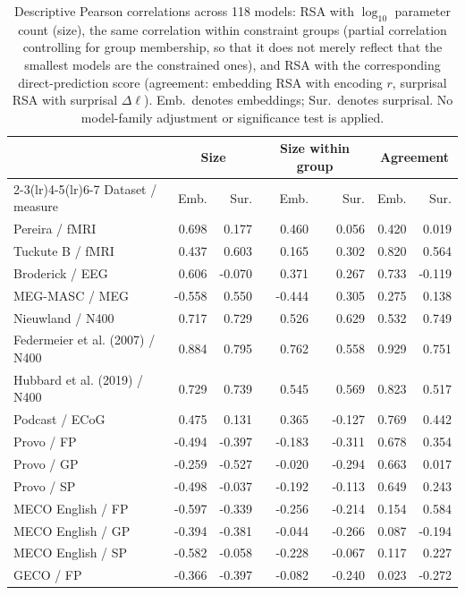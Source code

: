 \begin{table}[p]
\centering\small
\caption{Descriptive Pearson correlations across 118 models: RSA with $\log_{10}$ parameter count (size), the same correlation within constraint groups (partial correlation controlling for group membership, so that it does not merely reflect that the smallest models are the constrained ones), and RSA with the corresponding direct-prediction score (agreement: embedding RSA with encoding $r$, surprisal RSA with surprisal $\Delta\ell$). Emb.\ denotes embeddings; Sur.\ denotes surprisal. No model-family adjustment or significance test is applied.}
\label{tab:rsa-summary}
\begin{tabular}{lrrrrrr}
\toprule
& \multicolumn{2}{c}{Size} & \multicolumn{2}{c}{Size within group} & \multicolumn{2}{c}{Agreement}\\
\cmidrule(lr){2-3}\cmidrule(lr){4-5}\cmidrule(lr){6-7}
Dataset / measure & Emb. & Sur. & Emb. & Sur. & Emb. & Sur.\\
\midrule
Pereira / fMRI & 0.698 & 0.177 & 0.460 & 0.056 & 0.420 & 0.019 \\
Tuckute B / fMRI & 0.437 & 0.603 & 0.165 & 0.302 & 0.820 & 0.564 \\
Broderick / EEG & 0.606 & -0.070 & 0.371 & 0.267 & 0.733 & -0.119 \\
MEG-MASC / MEG & -0.558 & 0.550 & -0.444 & 0.305 & 0.275 & 0.138 \\
Nieuwland / N400 & 0.717 & 0.729 & 0.526 & 0.629 & 0.532 & 0.749 \\
Federmeier et al. (2007) / N400 & 0.884 & 0.795 & 0.762 & 0.558 & 0.929 & 0.751 \\
Hubbard et al. (2019) / N400 & 0.729 & 0.739 & 0.545 & 0.569 & 0.823 & 0.517 \\
Podcast / ECoG & 0.475 & 0.131 & 0.365 & -0.127 & 0.769 & 0.442 \\
\midrule
Provo / FP & -0.494 & -0.397 & -0.183 & -0.311 & 0.678 & 0.354 \\
Provo / GP & -0.259 & -0.527 & -0.020 & -0.294 & 0.663 & 0.017 \\
Provo / SP & -0.498 & -0.037 & -0.192 & -0.113 & 0.649 & 0.243 \\
MECO English / FP & -0.597 & -0.339 & -0.256 & -0.214 & 0.154 & 0.584 \\
MECO English / GP & -0.394 & -0.381 & -0.044 & -0.266 & 0.087 & -0.194 \\
MECO English / SP & -0.582 & -0.058 & -0.228 & -0.067 & 0.117 & 0.227 \\
GECO / FP & -0.366 & -0.397 & -0.082 & -0.240 & 0.023 & -0.272 \\

\end{tabular}
\end{table}
